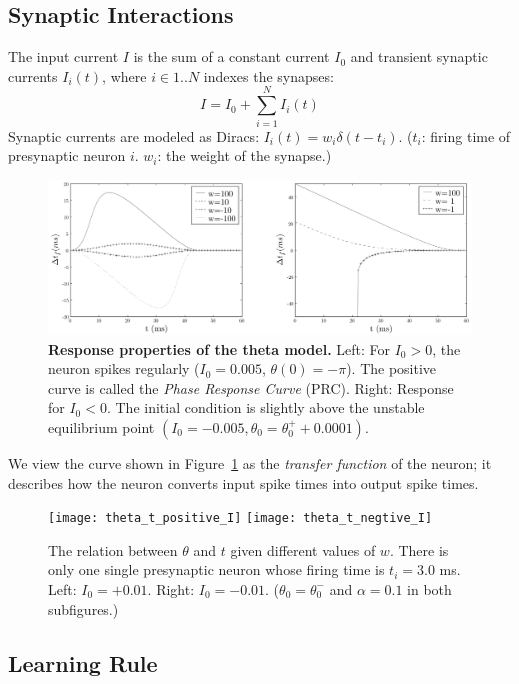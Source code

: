 \documentclass[final]{beamer}
\begin{document}
\begin{frame}[t]
\begin{multicols}{2}
\subsection{Synaptic Interactions}

The input current $I$ is the sum of a constant current $I_0$ and transient synaptic currents $I_i(t)$, 
where $i \in 1..N$ indexes the synapses:
\begin{equation}
	I = I_0 + \sum_{i=1}^N I_i(t)
\end{equation}
Synaptic currents are modeled as Diracs: $I_i(t) = w_i\delta(t - t_i)$.
($t_i$: firing time of presynaptic neuron $i$. $w_i$: the weight of the synapse.)

\begin{figure}
\centering
\includegraphics[width=0.98\columnwidth]{response}
\caption{\textbf{Response properties of the theta model.}
Left: For $I_0 > 0$, the neuron spikes regularly ($I_0 = 0.005$, $\theta(0) = -\pi$). 
The positive curve is called the \emph{Phase Response Curve} (PRC).
Right: Response for $I_0 < 0$.
The initial condition is slightly above the unstable equilibrium point $(I_0 = -0.005, \theta_0 = \theta_0^+ + 0.0001)$.}
\label{response}
\end{figure}
We view the curve shown in Figure~\ref{response} as the \emph{transfer function} of the neuron; 
it describes how the neuron converts input spike times into output spike times.

\begin{figure}
\centering
\texttt{[image: theta\_t\_positive\_I]}
\texttt{[image: theta\_t\_negtive\_I]}
\caption{The relation between $\theta$ and $t$ given different values of $w$. 
There is only one single presynaptic neuron whose firing time is $t_i = 3.0$ ms.
Left: $I_0 = +0.01$. Right: $I_0 = -0.01$. ($\theta_0 = \theta_0^-$ and $\alpha = 0.1$ in both subfigures.)}
\label{theta_t_negtive_I}
\end{figure}

\subsection{Learning Rule}


\end{multicols}
\end{frame}
\end{document}
